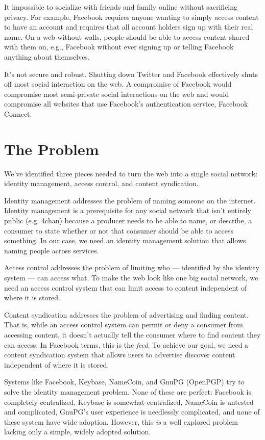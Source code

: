 \documentclass[pdftex,12pt,a4papaer,twoside,notitlepage]{report}
\begin{document}
It impossible to socialize with friends and family online without sacrificing
privacy. For example, Facebook requires anyone wanting to simply access content
to have an account and requires that all account holders sign up with their real
name. On a web without walls, people should be able to access content shared
with them on, e.g., Facebook without ever signing up or telling Facebook
anything about themselves.

It's not secure and robust. Shutting down Twitter and Facebook effectively shuts
off most social interaction on the web. A compromise of Facebook would
compromise most semi-private social interactions on the web and would compromise
all websites that use Facebook's authentication service, Facebook Connect.

\section{The Problem}

We've identified three pieces needed to turn the web into a single social
network: identity management, access control, and content syndication.

Identity management addresses the problem of naming someone on the internet.
Identity management is a prerequisite for any social network that isn't entirely
public (e.g. 4chan) because a producer needs to be able to name, or describe, a
consumer to state whether or not that consumer should be able to access
something. In our case, we need an identity management solution that allows
naming people across services.

Access control addresses the problem of limiting who --- identified by the
identity system --- can access what. To make the web look like one big social
network, we need an access control system that can limit access to content
independent of where it is stored.

Content syndication addresses the problem of advertising and finding content.
That is, while an access control system can permit or deny a consumer from
accessing content, it doesn't actually tell the consumer where to find content
they can access. In Facebook terms, this is the \emph{feed}. To achieve our
goal, we need a content syndication system that allows users to advertise
discover content independent of where it is stored.

Systems like Facebook, Keybase, NameCoin, and GnuPG (OpenPGP) try to solve the
identity management problem. None of these are perfect: Facebook is completely
centralized, Keybase is somewhat centralized, NameCoin is untested and
complicated, GnuPG's user experience is needlessly complicated, and none of
these system have wide adoption. However, this \emph{is} a well explored problem
lacking only a simple, widely adopted solution.
\end{document}

